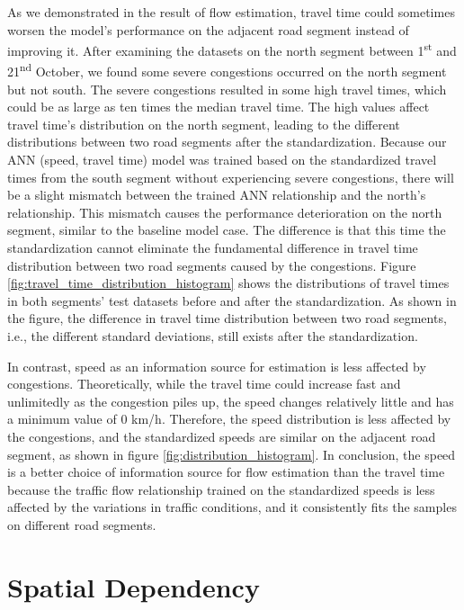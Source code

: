 \documentclass[english]{kththesis}
\begin{document}
As we demonstrated in the result of flow estimation, travel time could sometimes worsen the model's performance on the adjacent road segment instead of improving it. After examining the datasets on the north segment between 1\textsuperscript{st} and 21\textsuperscript{nd} October, we found some severe congestions occurred on the north segment but not south. The severe congestions resulted in some high travel times, which could be as large as ten times the median travel time. The high values affect travel time's distribution on the north segment, leading to the different distributions between two road segments after the standardization. Because our ANN (speed, travel time) model was trained based on the standardized travel times from the south segment without experiencing severe congestions, there will be a slight mismatch between the trained ANN relationship and the north's relationship. This mismatch causes the performance deterioration on the north segment, similar to the baseline model case.  The difference is that this time the standardization cannot eliminate the fundamental difference in travel time distribution between two road segments caused by the congestions. Figure \ref{fig:travel_time_distribution_histogram} shows the distributions of travel times in both segments' test datasets before and after the standardization. As shown in the figure, the difference in travel time distribution between two road segments, i.e., the different standard deviations, still exists after the standardization.

In contrast, speed as an information source for estimation is less affected by congestions. Theoretically, while the travel time could increase fast and unlimitedly as the congestion piles up, the speed changes relatively little and has a minimum value of 0 km/h. Therefore, the speed distribution is less affected by the congestions, and the standardized speeds are similar on the adjacent road segment, as shown in figure \ref{fig:distribution_histogram}. In conclusion, the speed is a better choice of information source for flow estimation than the travel time because the traffic flow relationship trained on the standardized speeds is less affected by the variations in traffic conditions, and it consistently fits the samples on different road segments.

\section{Spatial Dependency}
\label{sec:discussionSpatialDependency}
\end{document}
